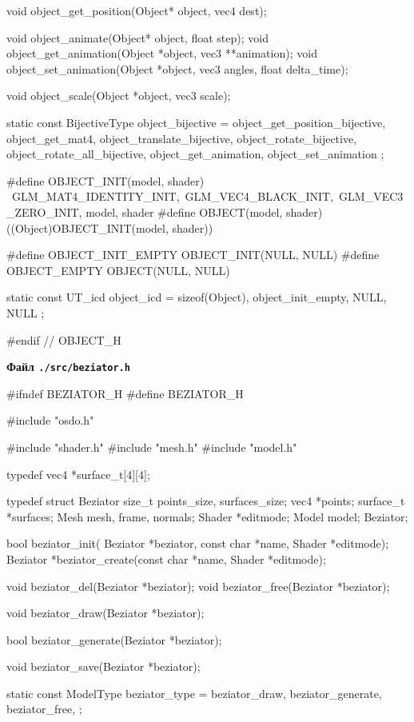 \begin{multicols}{2}
\begin{ccode}
void object_get_position(Object* object, vec4 dest);

void object_animate(Object* object, float step);
void object_get_animation(Object *object, vec3 **animation);
void object_set_animation(Object *object, vec3 angles, float delta_time);

void object_scale(Object *object, vec3 scale);

static const BijectiveType object_bijective = {
    object_get_position_bijective,
    object_get_mat4,
    object_translate_bijective,
    object_rotate_bijective,
    object_rotate_all_bijective,
    object_get_animation,
    object_set_animation
};

#define OBJECT_INIT(model, shader) {\
    GLM_MAT4_IDENTITY_INIT,\
    GLM_VEC4_BLACK_INIT,\
    GLM_VEC3_ZERO_INIT, model, shader}
#define OBJECT(model, shader) ((Object)OBJECT_INIT(model, shader))

#define OBJECT_INIT_EMPTY OBJECT_INIT(NULL, NULL)
#define OBJECT_EMPTY OBJECT(NULL, NULL)

static const UT_icd object_icd = {
    sizeof(Object), object_init_empty, NULL, NULL
};

#endif // OBJECT_H
\end{ccode}
\noindent\cprotect\textbf{Файл \verb+./src/beziator.h+}
\begin{ccode}
#ifndef BEZIATOR_H
#define BEZIATOR_H

#include "osdo.h"

#include "shader.h"
#include "mesh.h"
#include "model.h"

typedef vec4 *surface_t[4][4];

typedef struct Beziator {
    size_t points_size, surfaces_size;
    vec4 *points;
    surface_t *surfaces;
    Mesh mesh, frame, normals;
    Shader *editmode;
    Model model;
} Beziator;

bool beziator_init(
        Beziator *beziator, const char *name, Shader *editmode);
Beziator *beziator_create(const char *name, Shader *editmode);

void beziator_del(Beziator *beziator);
void beziator_free(Beziator *beziator);

void beziator_draw(Beziator *beziator);

bool beziator_generate(Beziator *beziator);

void beziator_save(Beziator *beziator);

static const ModelType beziator_type = {
    beziator_draw, beziator_generate, beziator_free,
};


\end{ccode}
\end{multicols}
